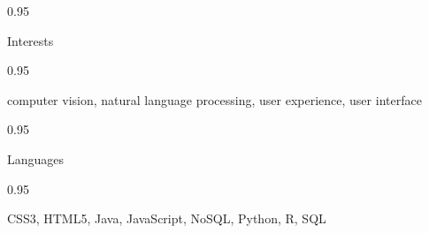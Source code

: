 \documentclass[a4paper,9pt]{article}
\newcommand{\doubleColumnGap}{\hspace{4mm}}
\newcommand{\withinSectionMarginBetween}{\vspace{-3ex}}
\newcommand{\mainLineSpacing}{0.95}
\begin{document}
\begin{minipage}[t]{0.20\linewidth}
  \begin{small}
    \begin{spacing}\mainLineSpacing{}
      \begin{flushright}
        Interests
      \end{flushright}
    \end{spacing}
  \end{small}
\end{minipage}
\doubleColumnGap{}
\begin{minipage}[t]{0.75\linewidth}
  \begin{small}
    \begin{spacing}\mainLineSpacing{}
      \begin{flushleft}
        computer vision, natural language processing, user experience, user interface
      \end{flushleft}
    \end{spacing}
  \end{small}
\end{minipage}

\withinSectionMarginBetween{}

\begin{minipage}[t]{0.20\linewidth}
  \begin{small}
    \begin{spacing}\mainLineSpacing{}
      \begin{flushright}
        Languages
      \end{flushright}
    \end{spacing}
  \end{small}
\end{minipage}
\doubleColumnGap{}
\begin{minipage}[t]{0.75\linewidth}
  \begin{small}
    \begin{spacing}\mainLineSpacing{}
      \begin{flushleft}
        CSS3, HTML5, Java, JavaScript, NoSQL, Python, R, SQL
      \end{flushleft}
    \end{spacing}
  \end{small}
\end{minipage}


\withinSectionMarginBetween{}
\end{document}
